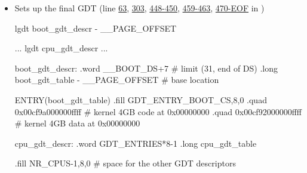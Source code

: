 \begin{itemize}
\item Sets up the final GDT
  (line \href{http://lxr.linux.no/linux+v2.6.11/arch/i386/kernel/head.S#L63}{63},
  \href{http://lxr.linux.no/linux+v2.6.11/arch/i386/kernel/head.S#L303}{303},
  \href{http://lxr.linux.no/linux+v2.6.11/arch/i386/kernel/head.S#L448}{448-450},
  \href{http://lxr.linux.no/linux+v2.6.11/arch/i386/kernel/head.S#L459}{459-463},
  \href{http://lxr.linux.no/linux+v2.6.11/arch/i386/kernel/head.S#L470}{470-EOF} in )
    \begin{gascode}
        lgdt boot_gdt_descr - __PAGE_OFFSET

        ...
        lgdt cpu_gdt_descr
        ...
        
boot_gdt_descr:
        .word __BOOT_DS+7                     # limit (31, end of DS)
        .long boot_gdt_table - __PAGE_OFFSET  # base location

ENTRY(boot_gdt_table)
        .fill GDT_ENTRY_BOOT_CS,8,0
        .quad 0x00cf9a000000ffff    # kernel 4GB code at 0x00000000 
        .quad 0x00cf92000000ffff    # kernel 4GB data at 0x00000000 

cpu_gdt_descr:
        .word GDT_ENTRIES*8-1
        .long cpu_gdt_table

        .fill NR_CPUS-1,8,0             # space for the other GDT descriptors
        

\end{gascode}
\end{itemize}

